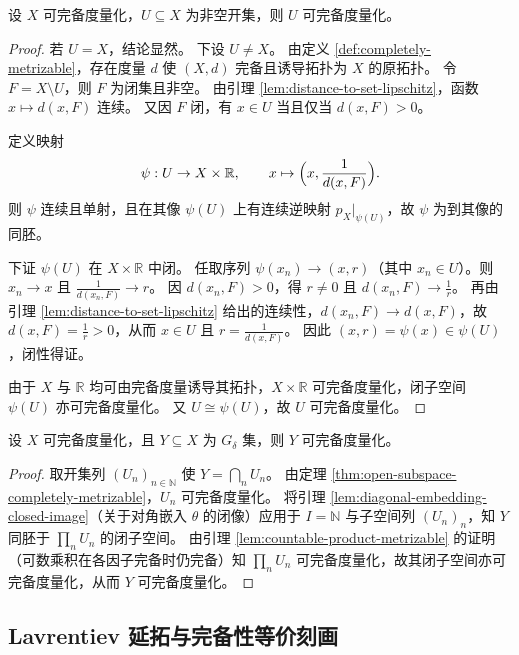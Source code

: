\documentclass[lang=cn,a4paper,newtx,figureplace=section,tableplace=section]{elegantbook}
\begin{document}
\begin{theorem}\label{thm:open-subspace-completely-metrizable}
  设 $X$ 可完备度量化，$U\subseteq X$ 为非空开集，则 $U$ 可完备度量化。
\end{theorem}
\begin{proof}
  若 $U=X$，结论显然。
  下设 $U\ne X$。
  由定义 \ref{def:completely-metrizable}，存在度量 $d$ 使 $(X,d)$ 完备且诱导拓扑为 $X$ 的原拓扑。
  令 $F=X\setminus U$，则 $F$ 为闭集且非空。
  由引理 \ref{lem:distance-to-set-lipschitz}，函数 $x\mapsto d(x,F)$ 连续。
  又因 $F$ 闭，有 $x\in U$ 当且仅当 $d(x,F)>0$。

  定义映射
  \[
    \psi:U\to X\times\mathbb R,\qquad x\mapsto \Bigl(x,\frac{1}{d(x,F)}\Bigr).
  \]
  则 $\psi$ 连续且单射，且在其像 $\psi(U)$ 上有连续逆映射 $p_X\vert_{\psi(U)}$，故 $\psi$ 为到其像的同胚。

  下证 $\psi(U)$ 在 $X\times\mathbb R$ 中闭。
  任取序列 $\psi(x_n)\to (x,r)$（其中 $x_n\in U$）。则 $x_n\to x$ 且 $\frac{1}{d(x_n,F)}\to r$。
  因 $d(x_n,F)>0$，得 $r\ne 0$ 且 $d(x_n,F)\to \frac{1}{r}$。
  再由引理 \ref{lem:distance-to-set-lipschitz} 给出的连续性，$d(x_n,F)\to d(x,F)$，故 $d(x,F)=\frac{1}{r}>0$，从而 $x\in U$ 且 $r=\frac{1}{d(x,F)}$。
  因此 $(x,r)=\psi(x)\in\psi(U)$，闭性得证。

  由于 $X$ 与 $\mathbb R$ 均可由完备度量诱导其拓扑，$X\times\mathbb R$ 可完备度量化，闭子空间 $\psi(U)$ 亦可完备度量化。
  又 $U\cong\psi(U)$，故 $U$ 可完备度量化。
\end{proof}

\begin{corollary}\label{cor:gdelta-subspace-completely-metrizable}
  设 $X$ 可完备度量化，且 $Y\subseteq X$ 为 $G_\delta$ 集，则 $Y$ 可完备度量化。
\end{corollary}
\begin{proof}
  取开集列 $(U_n)_{n\in\mathbb N}$ 使 $Y=\bigcap_n U_n$。
  由定理 \ref{thm:open-subspace-completely-metrizable}，$U_n$ 可完备度量化。
  将引理 \ref{lem:diagonal-embedding-closed-image}（关于对角嵌入 $\theta$ 的闭像）应用于 $I=\mathbb N$ 与子空间列 $(U_n)_n$，知 $Y$ 同胚于 $\prod_n U_n$ 的闭子空间。
  由引理 \ref{lem:countable-product-metrizable} 的证明（可数乘积在各因子完备时仍完备）知 $\prod_n U_n$ 可完备度量化，故其闭子空间亦可完备度量化，从而 $Y$ 可完备度量化。
\end{proof}

\subsection{Lavrentiev 延拓与完备性等价刻画}
\end{document}
